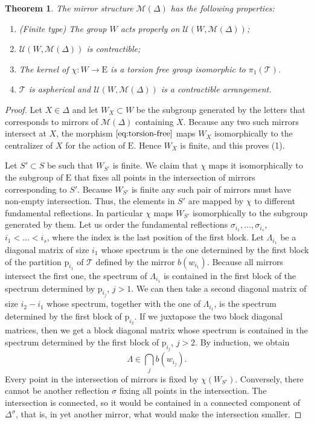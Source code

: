 \documentclass[reqno]{amsart}
\newcommand{\p}{\mathrm{p}}
\newcommand{\cM}{\mathcal{M}}
\newcommand{\cT}{\mathcal{T}}
\newcommand{\cU}{\mathcal{U}}
\newcommand{\E}{\mathrm{E}}
\newtheorem{theorem}{Theorem}[section]
\begin{document}
\begin{theorem}\label{thm:mirror} The mirror structure $\cM(\Delta)$ has the following properties:
 \begin{enumerate}
  \item (Finite type) The group $W$ acts properly on $\cU(W,\cM(\Delta))$;
 \item $\cU(W,\cM(\Delta))$ is contractible;
  \item The kernel of $\chi:W\to \mathrm{E}$
  is a torsion free group isomorphic to $\pi_1(\cT)$.
  \item  $\cT$ is aspherical and  $\cU(W,\cM(\Delta))$ is a contractible arrangement.
 \end{enumerate}
\end{theorem}
\begin{proof}
Let $X\in \Delta$ and let $W_X\subset W$ be the subgroup generated by the letters that corresponds to mirrors of $\cM(\Delta)$ containing $X$. Because any two such mirrors intersect at $X$, the morphism $\eqref{eq:torsion-free}$ maps $W_X$ isomorphically  to the centralizer of $X$ for the action of $\E$. Hence  $W_X$ is finite, and this proves (1).

Let $S'\subset S$ be such that $W_{S'}$ is finite. We claim that $\chi$  maps it isomorphically to the subgroup of $\E$ that fixes all points in the intersection of mirrors corresponding to $S'$. Because $W_{S'}$ is finite any such pair of mirrors must have non-empty intersection. Thus, the elements in $S'$ are mapped by $\chi$ to different fundamental reflections. In particular $\chi$ maps $W_{S'}$ isomorphically to the subgroup generated by them. Let us order the fundamental reflections $\sigma_{i_1},\dots,\sigma_{i_s}$, $i_1<\dots <i_s$, where the index is the last position of the first block. Let $\Lambda_{i_1}$ be
a diagonal matrix of size $i_1$ whose spectrum is the one determined by the first block of the partition $\p_{i_1}$ of $\cT$ defined by the mirror $b(w_{i_1})$. Because all mirrors intersect the first one, the spectrum of $\Lambda_{i_1}$ is contained in the first block of the spectrum determined by $\p_{i_j}$, $j>1$. We can then take a second diagonal matrix of size $i_2-i_1$ whose spectrum, together with the one of $\Lambda_{i_1}$, is the spectrum determined by the first block of $\p_{i_2}$. If we juxtapose the two block diagonal matrices, then  we get a block diagonal matrix whose spectrum is contained in the spectrum determined by the first block of $\p_{i_j}$, $j>2$. By induction, we obtain
\[\Lambda\in \bigcap_{j} b(w_{i_j}).\]
Every point in the intersection of mirrors is fixed by $\chi(W_{S'})$. Conversely, there cannot be another reflection $\sigma$ fixing all points in the intersection. The intersection is connected, so it would be contained in a  connected component of $\Delta^\sigma$, that is, in yet another mirror, what would make the intersection smaller.



\end{proof}
\end{document}
